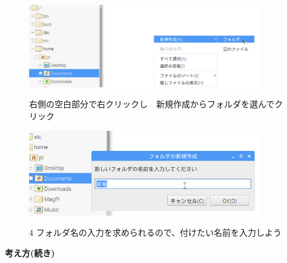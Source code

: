 \documentclass[a4paper,12pt]{jarticle}
\begin{document}
\begin{figure}[ht]
\includegraphics[width=0.9\textwidth]{textbook-img034.png}
\begin{minipage}{15.758cm}
右側の空白部分で右クリックし　新規作成からフォルダを選んでクリック
\end{minipage}
\begin{minipage}{\textwidth}
\includegraphics[width=0.9\textwidth]{textbook-img036.png}
\end{minipage}
\begin{minipage}{12.336cm}
4
フォルダ名の入力を求められるので、付けたい名前を入力しよう
\end{minipage}
\end{figure}
\clearpage
{\bf\large 考え方(続き)}
\end{document}

